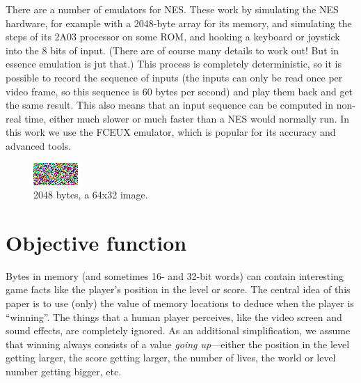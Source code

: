 \documentclass[twocolumn]{article}
\newcommand\comment[1]{}
\begin{document}

There are a number of emulators for NES. These work by simulating the NES hardware, for example with a 2048-byte array for its memory, and simulating the steps of its 2A03 processor on some ROM, and hooking a keyboard or joystick into the 8 bits of input. (There are of course many details to work out! But in essence emulation is jut that.) This process is completely deterministic, so it is possible to record the sequence of inputs (the inputs can only be read once per video frame, so this sequence is 60 \comment{ XXX CHECK } bytes per second) and play them back and get the same result. This also means that an input sequence can be computed in non-real time, either much slower or much faster than a NES would normally run. In this work we use the FCEUX emulator, which is popular for its accuracy and advanced tools.

\begin{figure}[ht]
\begin{center}
\includegraphics[width=0.75 \linewidth]{bytes2048}
\end{center}\vspace{-0.1in}
\caption{2048 bytes, a 64x32 image.}
\label{fig:bytes2048}
\end{figure}

\section{Objective function}

Bytes in memory (and sometimes 16- and 32-bit words) can contain interesting game facts like the player's position in the level or score. The central idea of this paper is to use (only) the value of memory locations to deduce when the player is ``winning''. The things that a human player perceives, like the video screen and sound effects, are completely ignored. As an additional simplification, we assume that winning always consists of a value {\it going up}---either the position in the level getting larger, the score getting larger, the number of lives, the world or level number getting bigger, etc.
\end{document}
